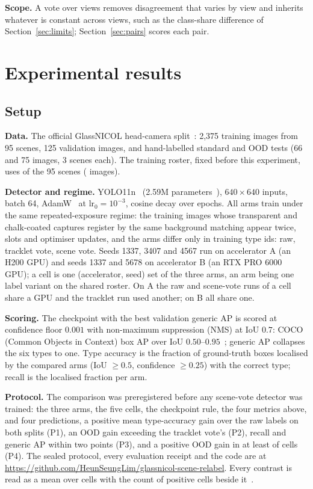\documentclass{article}
\begin{document}
\noindent\textbf{Scope.} A vote over views removes disagreement that varies by view and inherits whatever is constant across views, such as the class-share difference of Section~\ref{sec:limits}; Section~\ref{sec:pairs} scores each pair.

\section{Experimental results}
\label{sec:results}
\subsection{Setup}
\label{sec:setup}
\noindent\textbf{Data.} The official GlassNICOL head-camera split~\cite{gajdosech2025glassnicol}: 2,375 training images from 95 scenes, 125 validation images, and hand-labelled standard and OOD tests (66 and 75 images, 3 scenes each). The training roster, fixed before this experiment, uses \ScenesTrain{} of the 95 scenes (\ImagesTrainScene{} images).

\noindent\textbf{Detector and regime.} YOLO11n~\cite{jocher2024yolo11} (2.59M parameters~\cite{sapkota2025yolo}), $640\!\times\!640$ inputs, batch 64, AdamW~\cite{loshchilov2019adamw} at $\mathrm{lr}_0=10^{-3}$, cosine decay over \SceneEpochs{} epochs. All arms train under the same repeated-exposure regime: the \SceneRepeatSlots{} training images whose transparent and chalk-coated captures register by the same background matching appear twice, \SceneSlots{} slots and \SceneUpdates{} optimiser updates, and the arms differ only in training type ids: raw, tracklet vote, scene vote. Seeds 1337, 3407 and 4567 run on accelerator A (an H200 GPU) and seeds 1337 and 5678 on accelerator B (an RTX PRO 6000 GPU); a cell is one (accelerator, seed) set of the three arms, an arm being one label variant on the shared roster. On A the raw and scene-vote runs of a cell share a GPU and the tracklet run used another; on B all share one.

\noindent\textbf{Scoring.} The checkpoint with the best validation generic AP is scored at confidence floor $0.001$ with non-maximum suppression (NMS) at IoU $0.7$: COCO (Common Objects in Context) box AP over IoU $0.50$--$0.95$~\cite{lin2014coco}; generic AP collapses the six types to one. Type accuracy is the fraction of ground-truth boxes localised by the compared arms (IoU $\geq0.5$, confidence $\geq0.25$) with the correct type; recall is the localised fraction per arm.

\noindent\textbf{Protocol.} The comparison was preregistered before any scene-vote detector was trained: the three arms, the five cells, the checkpoint rule, the four metrics above, and four predictions, a positive mean type-accuracy gain over the raw labels on both splits (P1), an OOD gain exceeding the tracklet vote's (P2), recall and generic AP within two points (P3), and a positive OOD gain in at least \SvTypeOODVsRawPos{} of \SvCells{} cells (P4). The sealed protocol, every evaluation receipt and the code are at \url{https://github.com/HeunSeungLim/glassnicol-scene-relabel}. Every contrast is read as a mean over cells with the count of positive cells beside it~\cite{bouthillier2021variance}.
\end{document}
